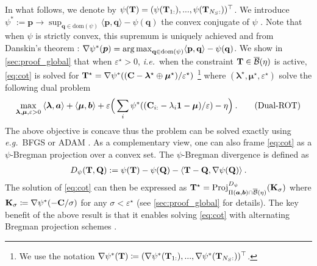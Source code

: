 In what follows, we denote by $\psi({\mathbf{T}}) = (\psi({\mathbf{T}}_{1:}), ..., \psi({\mathbf{T}}_{N_S:}))^\top$.
We introduce $\psi^*:= \mathbf{p} \to \sup_{\mathbf{q} \in \mathrm{dom}(\psi)} \langle \mathbf{p}, \mathbf{q} \rangle - \psi(\mathbf{q})$ the convex conjugate of $\psi$ \citep{rockafellar1997convex}.
Note that when $\psi$ is strictly convex, this supremum is uniquely achieved and from Danskin's theorem \citep{danskin1966theory}: $\nabla \psi^*(\bm{p}) = \operatorname*{arg\,max}_{\mathbf{q} \in \mathrm{dom}(\psi)} \langle \mathbf{p}, \mathbf{q} \rangle - \psi(\mathbf{q})$. 
We show in \cref{sec:proof_global} that when $\varepsilon^\star > 0$, \textit{i.e.}\ when the constraint ${\mathbf{T}} \in \overline{\mathcal{B}}(\eta)$ is active, \eqref{eq:cot} is solved for ${\mathbf{T}}^\star = \nabla \psi^*(({\mathbf{C}} - \bm{\lambda}^\star \oplus \bm{\mu}^\star) / \varepsilon^\star)$ \footnote{We use the notation $\nabla \psi^*({\mathbf{T}}) \coloneqq (\nabla \psi^*({\mathbf{T}}_{1:}), ..., \nabla \psi^*({\mathbf{T}}_{N_S:}))^\top$.} where $(\bm{\lambda}^\star, \bm{\mu}^\star, \varepsilon^\star)$ solve the following dual problem 
\begin{align}
    \max_{\bm{\lambda}, \bm{\mu}, \varepsilon>0}  \: \langle \bm{\lambda}, \bm{a} \rangle + \langle \bm{\mu}, \bm{b} \rangle + \varepsilon \Big(\sum_i \psi^*(({\mathbf{C}}_{i:} - \lambda_i \bm{1} - \bm{\mu}) / \varepsilon) - \eta \Big) \:.
    \tag{Dual-ROT}
\end{align}
The above objective is concave thus the problem can be solved exactly using \textit{e.g.}\ BFGS \citep{liu1989limited} or ADAM \citep{kingma2014adam}.
As a complementary view, one can also frame \eqref{eq:cot} as a $\psi$-Bregman projection over a convex set. The $\psi$-Bregman divergence is defined as 
\begin{align}
    D_\psi({\mathbf{T}}, {\mathbf{Q}}) := \psi({\mathbf{T}}) - \psi({\mathbf{Q}}) - \langle {\mathbf{T}} - {\mathbf{Q}}, \nabla \psi({\mathbf{Q}}) \rangle \:.
\end{align}
The solution of \eqref{eq:cot} can then be expressed as
${\mathbf{T}}^\star = \operatorname{Proj}^{D_\psi}_{\Pi(\bm{a}, \bm{b}) \cap \overline{\mathcal{B}}(\eta)}({\mathbf{K}}_\sigma)$
where ${\mathbf{K}}_\sigma \coloneqq \nabla \psi^*(- {\mathbf{C}} / \sigma)$ for any $\sigma < \varepsilon^\star$ (see \cref{sec:proof_global} for details). The key benefit of the above result is that it enables solving \eqref{eq:cot} with alternating Bregman projection schemes \citep{benamou2015iterative}.

